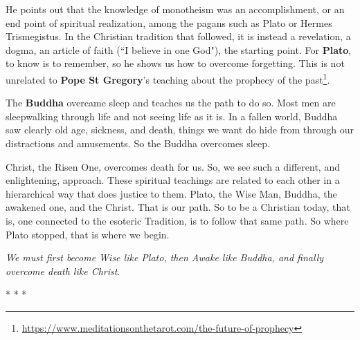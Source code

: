 He points out that the knowledge of monotheism was an accomplishment, or an end point of spiritual realization, among the pagans such as Plato or Hermes Trismegistus. In the Christian tradition that followed, it is instead a revelation, a dogma, an article of faith (``I believe in one God"), the starting point. For \textbf{Plato}, to know is to remember, so he shows us how to overcome forgetting. This is not unrelated to \textbf{Pope St Gregory}'s teaching about the prophecy of the past\footnote{\url{https://www.meditationsonthetarot.com/the-future-of-prophecy}}.

The \textbf{Buddha} overcame sleep and teaches us the path to do so. Most men are sleepwalking through life and not seeing life as it is. In a fallen world, Buddha saw clearly old age, sickness, and death, things we want do hide from through our distractions and amusements. So the Buddha overcomes sleep.

Christ, the Risen One, overcomes death for us. So, we see such a different, and enlightening, approach. These spiritual teachings are related to each other in a hierarchical way that does justice to them. Plato, the Wise Man, Buddha, the awakened one, and the Christ. That is our path. So to be a Christian today, that is, one connected to the esoteric Tradition, is to follow that same path. So where Plato stopped, that is where we begin.

\emph{We must first become Wise like Plato, then Awake like Buddha, and finally overcome death like Christ}.




\begin{center}* * *\end{center}

